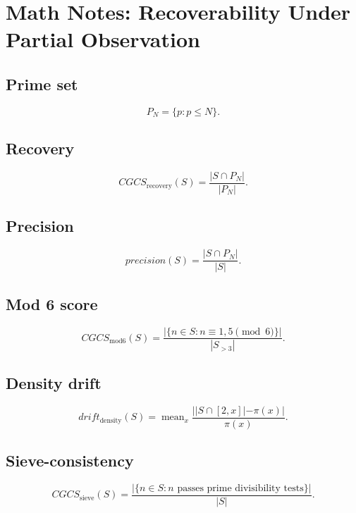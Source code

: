 \documentclass{article}
\begin{document}
\section*{Math Notes: Recoverability Under Partial Observation}

\subsection*{Prime set}

\[
P_N = \{p : p \le N\}.
\]

\subsection*{Recovery}

\[
CGCS_{\mathrm{recovery}}(S)=
\frac{|S \cap P_N|}{|P_N|}.
\]

\subsection*{Precision}

\[
precision(S)=
\frac{|S \cap P_N|}{|S|}.
\]

\subsection*{Mod 6 score}

\[
CGCS_{\mathrm{mod6}}(S)=
\frac{|\{n\in S:n\equiv 1,5\pmod6\}|}{|S_{>3}|}.
\]

\subsection*{Density drift}

\[
drift_{\mathrm{density}}(S)=
\operatorname{mean}_x
\frac{||S\cap[2,x]|-\pi(x)|}{\pi(x)}.
\]

\subsection*{Sieve-consistency}

\[
CGCS_{\mathrm{sieve}}(S)=
\frac{|\{n\in S:n\text{ passes prime divisibility tests}\}|}{|S|}.
\]
\end{document}
